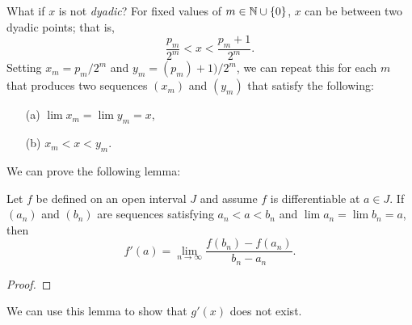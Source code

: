 What if \( x  \) is not \textit{dyadic}? For fixed values of \( m \in \mathbb{N} \cup \{ 0  \}  \), \( x  \) can be between two dyadic points; that is, 
\[  \frac{ p_m  }{ 2^m } < x < \frac{ p_m + 1  }{ 2^m }. \] Setting \( x_m = p_m / 2^m \) and \( y_m = (p_m) + 1) / 2^m  \), we can repeat this for each \( m  \) that produces two sequences \( (x_m)  \) and \( (y_m)  \) that satisfy the following:
\begin{enumerate}
    \item[(a)] \( \lim x_m = \lim y_m = x   \), 
    \item[(b)] \( x_m < x < y_m \).
\end{enumerate}

We can prove the following lemma:
\begin{lemma}
Let \( f  \) be defined on an open interval \( J  \) and assume \( f  \) is differentiable at \( a \in J  \). If \( (a_n)  \) and \( (b_n)  \) are sequences satisfying \( a_n < a < b_n  \) and \( \lim a_n = \lim b_n = a  \), then 
\[ f'(a) = \lim_{ n \to \infty  } \frac{ f(b_n) - f(a_n)  }{ b_n - a_n  }. \]
\end{lemma}
\begin{proof}

\end{proof}
We can use this lemma to show that \( g'(x)  \) does not exist.




